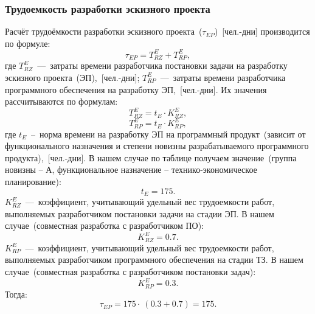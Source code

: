         \subsubsection{Трудоемкость разработки эскизного проекта}
            Расчёт трудоёмкости разработки эскизного проекта~($\tau_{EP}$)~[чел.-дни] производится по формуле:
            $$\tau_{EP} = T^E_{RZ} + T^E_{RP},$$
            где $T^E_{RZ}$~---~затраты времени разработчика постановки задачи на разработку эскизного проекта~(ЭП),~[чел.-дни];
            $T^E_{RP}$~---~затраты времени разработчика программного обеспечения на разработку ЭП,~[чел.-дни].
            Их значения рассчитываются по формулам:
            $$T^E_{RZ} = t_E \cdot  K^E_{RZ},$$
            $$T^E_{RP} = t_E \cdot  K^E_{RP},$$
            где $t_E$~--~норма времени на разработку ЭП на программный продукт~(зависит от функционального назначения и степени новизны разрабатываемого программного продукта),~[чел.-дни].
            В нашем случае по таблице получаем значение~(группа новизны – А, функциональное назначение – технико-экономическое планирование):
            $$t_E = 175.$$
            $K^E_{RZ}$~---~коэффициент, учитывающий удельный вес трудоемкости работ, выполняемых разработчиком постановки задачи на стадии ЭП.
            В нашем случае~(совместная разработка с разработчиком ПО):
            $$K^E_{RZ} = 0.7.$$
            $K^E_{RP}$~---~коэффициент, учитывающий удельный вес трудоемкости работ, выполняемых разработчиком программного обеспечения на стадии ТЗ.
            В нашем случае~(совместная разработка с разработчиком постановки задач):
            $$K^E_{RP} = 0.3.$$
            Тогда:
            $$\tau_{EP} = 175 \cdot ~(0.3 + 0.7) = 175.$$

